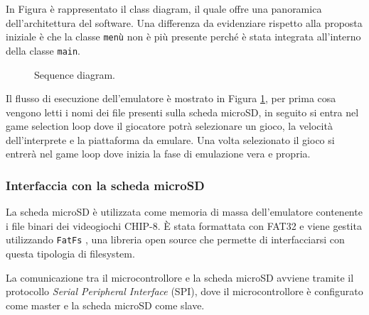 \documentclass[a4paper]{article}
\begin{document}
In Figura \label{fig:class_diagram} è rappresentato il class diagram, il quale offre una panoramica
dell'architettura del software. Una differenza da evidenziare rispetto alla proposta iniziale
è che la classe \texttt{menù} non è più presente perché è stata integrata all'interno della
classe \texttt{main}.

\begin{figure}[h!t]
    \begin{center}
        
    \end{center}
    \caption{
        Sequence diagram.
    }
    \label{fig:sequence_diagram}
\end{figure}

Il flusso di esecuzione dell'emulatore è mostrato in Figura \ref{fig:sequence_diagram},
per prima cosa vengono letti i nomi dei file presenti sulla scheda microSD, in seguito
si entra nel game selection loop dove il giocatore potrà selezionare un gioco, la velocità
dell'interprete e la piattaforma da emulare. Una volta selezionato il gioco si entrerà nel
game loop dove inizia la fase di emulazione vera e propria.

\subsubsection{Interfaccia con la scheda microSD}\label{subsubsec:sd}

La scheda microSD è utilizzata come memoria di massa dell'emulatore contenente i file
binari dei videogiochi CHIP-8. È stata formattata con FAT32 e viene gestita utilizzando
\texttt{FatFs} \cite{elm-chan:fatfs}, una libreria open source che permette di
interfacciarsi con questa tipologia di filesystem.

La comunicazione tra il microcontrollore e la scheda microSD avviene tramite il protocollo
\textit{Serial Peripheral Interface} (SPI), dove il microcontrollore è configurato come
master e la scheda microSD come slave.

%

%
\end{document}
